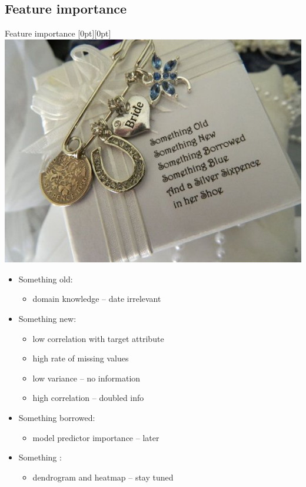 \documentclass[hyperref={bookmarks=false}]{beamer}
\begin{document}
\subsection{Feature importance}
\begin{frame}{Feature importance}
\mbox{}\hfill\raisebox{-\height}[0pt][0pt]{\includegraphics[width=.42\linewidth]{../slike/something.jpg}}
\vspace*{-\baselineskip}

\begin{itemize}
    \item Something old:
    \begin{itemize}
        \item domain knowledge -- date irrelevant
    \end{itemize}
    
    \item Something new:
    \begin{itemize}
        \item low correlation with target attribute
        \item high rate of missing values
        \item low variance -- no information
        \item high correlation -- doubled info
    \end{itemize}
    
    \item Something borrowed:
    \begin{itemize}
        \item model predictor importance -- later
    \end{itemize}
    
    \item Something \color{teal}{blue}\color{black}:
    \begin{itemize}
        \item dendrogram and heatmap -- stay tuned
    \end{itemize}
\end{itemize}
\end{frame}
\end{document}
